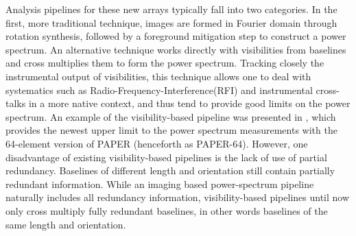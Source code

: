 \documentclass[twocolumn,apj,numberedappendix]{emulateapj}
\renewcommand\[{\begin{equation}}
\renewcommand\]{\end{equation}}
\begin{document}
Analysis pipelines for these new arrays typically fall into two categories. In the first, more traditional technique, images are formed in Fourier domain through rotation synthesis, followed by a foreground mitigation step to construct a power spectrum. An alternative technique works directly with visibilities from baselines and cross multiplies them to form the power spectrum. Tracking closely the instrumental output of visibilities, this technique allows one to deal with systematics such as Radio-Frequency-Interference(RFI) and instrumental cross-talks in a more native context, and thus tend to provide good limits on the power spectrum. An example of the visibility-based pipeline was presented in \cite{Ali2015}, which provides the newest upper limit to the power spectrum
measurements with the 64-element version of PAPER (henceforth as PAPER-64). However, one disadvantage of existing visibility-based pipelines is the lack of use of partial redundancy. Baselines of different length and orientation still contain partially redundant information. While an imaging based power-spectrum pipeline naturally includes all redundancy information, visibility-based pipelines until now only cross multiply fully redundant baselines, in other words baselines of the same length and orientation.
\end{document}
